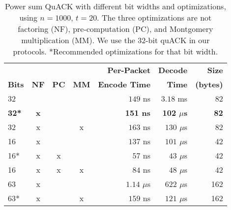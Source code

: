 \begin{table}[ht]
  \centering
  \begin{tabular}{lcccrrr}
    \toprule
    \bf     & \bf        & \bf       & \bf        & \bf Per-Packet & \bf Decode & \bf Size\\
    \bf Bits  & \bf NF     & \bf PC    & \bf MM     & \bf Encode Time & \bf Time     & \bf (bytes)\\
    \midrule
    32     &        &       &        & $149$ ns & $3.18$ ms      & 82 \\
    \bf \textcolor{black!50!blue}{32*} & \bf \textcolor{black!50!blue}{x} & & & \bf \textcolor{black!50!blue}{151 ns} & \bf \textcolor{black!50!blue}{102 ${\mu}$s} & \bf \textcolor{black!50!blue}{82} \\
    32     & x      &       & x      & $163$ ns & $130$ ${\mu}$s & 82 \\
    16     & x      &       &        & $137$ ns & $101$ ${\mu}$s & 42 \\
    16*    & x      & x     &        & $57$ ns & $43$ ${\mu}$s & 42 \\
    16     & x      & x     & x      & $84$ ns & $48$ ${\mu}$s & 42 \\
    63     & x      &       &        & $1.14$ ${\mu}$s & $622$ ${\mu}$s & 162 \\
    63*    & x      &       & x      & $159$ ns & $121$ ${\mu}$s & 162 \\
    \bottomrule
  \end{tabular}
  \caption{Power sum QuACK with different bit widths and optimizations,
  using $n=1000$, $t=20$. The three optimizations are not factoring (NF),
  pre-computation (PC), and Montgomery multiplication (MM). We use the 32-bit
  quACK in our \sys protocols.
  *Recommended optimizations for that bit width.}
  \label{tab:optimized-quack}
\end{table}
